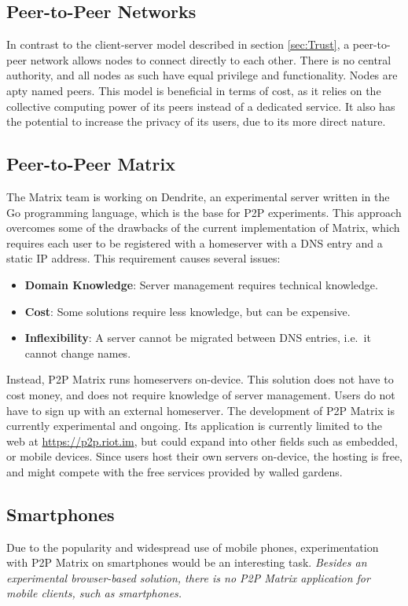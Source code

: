 \subsection{Peer-to-Peer Networks}
In contrast to the client-server model described in section \ref{sec:Trust}, a peer-to-peer network allows nodes to connect directly to each other.
There is no central authority, and all nodes as such have equal privilege and functionality.
Nodes are apty named peers.
This model is beneficial in terms of cost, as it relies on the collective computing power of its peers instead of a dedicated service.
It also has the potential to increase the privacy of its users, due to its more direct nature.


\subsection{Peer-to-Peer Matrix}
The Matrix team is working on Dendrite\cite{matrix_org_dendrite}, an experimental server written in the Go programming language, which is the base for \ac{P2P} experiments.
This approach overcomes some of the drawbacks of the current implementation of Matrix, which requires each user to be registered with a homeserver with a \ac{DNS} entry and a static IP address.
This requirement causes several issues:
\begin{itemize}
    \item{
          \textbf{Domain Knowledge}:
          Server management requires technical knowledge.
          }
    \item{
          \textbf{Cost}:
          Some solutions require less knowledge, but can be expensive.
          }
    \item{
          \textbf{Inflexibility}:
          A server cannot be migrated between \ac{DNS} entries, i.e.~it cannot change names.
          }
\end{itemize}
Instead, \ac{P2P} Matrix runs homeservers on-device.
This solution does not have to cost money, and does not require knowledge of server management.
Users do not have to sign up with an external homeserver.
The development of \ac{P2P} Matrix is currently experimental and ongoing.
Its application is currently limited to the web at \url{https://p2p.riot.im}, but could expand into other fields such as embedded, or mobile devices.
Since users host their own servers on-device, the hosting is free, and might compete with the free services provided by walled gardens.

\subsection{Smartphones}
Due to the popularity and widespread use of mobile phones, experimentation with \ac{P2P} Matrix on smartphones would be an interesting task.
\textit{Besides an experimental browser-based solution\cite{fosdem_event_p2p_matrix}, there is no \ac{P2P} Matrix application for mobile clients, such as smartphones.}

